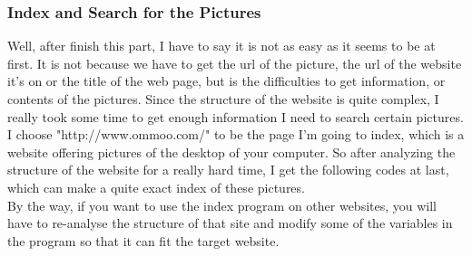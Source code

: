 \documentclass{article}
\begin{document}
\subsubsection{Index and Search for the Pictures}
Well, after finish this part, I have to say it is not as easy as it seems to be at first. It is not because we have to get the url of the picture, the url of the website it's on or the title of the web page, but is the difficulties to get information, or contents of the pictures. Since the structure of the website is quite complex, I really took some time to get enough information I need to search certain pictures.\\
I choose "http://www.ommoo.com/" to be the page I'm going to index, which is a website offering pictures of the desktop of your computer. So after analyzing the structure of the website for a really hard time, I get the following codes at last, which can make a quite exact index of these pictures.\\
By the way, if you want to use the index program on other websites, you will have to re-analyse the structure of that site and modify some of the variables in the program so that it can fit the target website.\\
\end{document}
